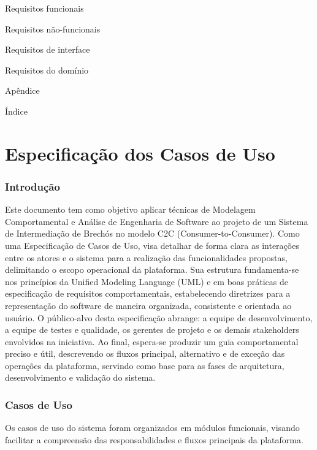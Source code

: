 ﻿\documentclass[12pt,a4paper]{article}
\begin{document}
\hspace{1cm}Requisitos funcionais\dotfill \pageref{sec:RequisitosFuncionais}

\hspace{1cm}Requisitos não-funcionais\dotfill \pageref{sec:RequisitosNaoFuncionais}

\hspace{1cm}Requisitos de interface\dotfill \pageref{sec:RequisitosInterface}

\hspace{1cm}Requisitos do domínio\dotfill \pageref{sec:RequisitosDominio}

Apêndice\dotfill \pageref{sec:Apendice}

Índice\dotfill \pageref{sec:Indice}

\clearpage
\part{Especifica\c{c}\~ao dos Casos de Uso}
\section{Introdução}
Este documento tem como objetivo aplicar técnicas de Modelagem Comportamental e Análise de Engenharia de Software ao projeto de um Sistema de Intermediação de Brechós no modelo C2C (Consumer-to-Consumer). Como uma Especificação de Casos de Uso, visa detalhar de forma clara as interações entre os atores e o sistema para a realização das funcionalidades propostas, delimitando o escopo operacional da plataforma.
Sua estrutura fundamenta-se nos princípios da Unified Modeling Language (UML) e em boas práticas de especificação de requisitos comportamentais, estabelecendo diretrizes para a representação do software de maneira organizada, consistente e orientada ao usuário. O público-alvo desta especificação abrange: a equipe de desenvolvimento, a equipe de testes e qualidade, os gerentes de projeto e os demais stakeholders envolvidos na iniciativa.
Ao final, espera-se produzir um guia comportamental preciso e útil, descrevendo os fluxos principal, alternativo e de exceção das operações da plataforma, servindo como base para as fases de arquitetura, desenvolvimento e validação do sistema.

\section{Casos de Uso}
\label{sec:CasosDeUso}

Os casos de uso do sistema foram organizados em módulos funcionais, visando facilitar a compreensão das responsabilidades e fluxos principais da plataforma.
\end{document}
